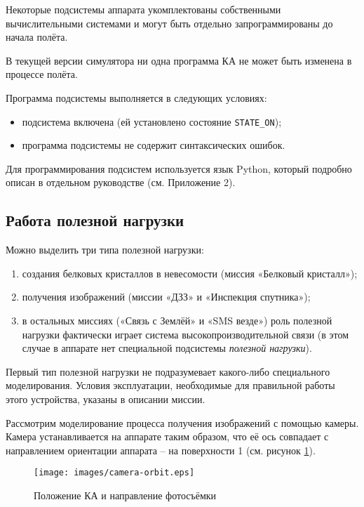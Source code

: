 \documentclass[12pt,a4paper]{article}
\begin{document}
Некоторые подсистемы аппарата укомплектованы собственными вычислительными системами и
могут быть отдельно запрограммированы до начала полёта.

В текущей версии симулятора ни одна программа КА не может быть изменена в процессе полёта.

Программа подсистемы выполняется в следующих условиях:

\begin{itemize}
\item подсистема включена (ей установлено состояние \verb'STATE_ON');
\item программа подсистемы не содержит синтаксических ошибок.
\end{itemize}
  
Для программирования подсистем используется язык Python, который подробно описан в
отдельном руководстве (см. Приложение 2).

\subsection{Работа полезной нагрузки}
\label{Sec:Load}

Можно выделить три типа полезной нагрузки:

\begin{enumerate}
\item создания белковых кристаллов в невесомости (миссия «Белковый кристалл»);
\item получения изображений (миссии «ДЗЗ» и «Инспекция спутника»);
\item в остальных миссиях («Связь с Землёй» и «SMS везде») роль полезной нагрузки
  фактически играет система высокопроизводительной связи (в этом случае в аппарате нет
  специальной подсистемы \emph{полезной нагрузки}).
\end{enumerate}
  
Первый тип полезной нагрузки не подразумевает какого-либо специального
моделирования. Условия эксплуатации, необходимые для правильной работы этого устройства,
указаны в описании миссии.

Рассмотрим моделирование процесса получения изображений с помощью камеры. Камера
устанавливается на аппарате таким образом, что её ось совпадает с направлением ориентации
аппарата – на поверхности 1 (см. рисунок \ref{Pic:Camera-Orbit}).

\begin{figure}[tbh]
  \begin{center}
    \texttt{[image: images/camera-orbit.eps]}
    \caption{Положение КА и направление фотосъёмки}
    \label{Pic:Camera-Orbit}
  \end{center}
\end{figure}
\end{document}
